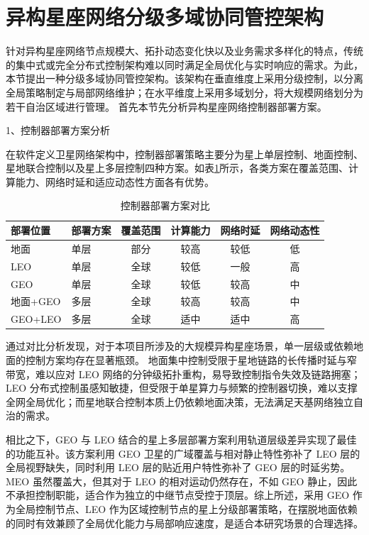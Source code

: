 \documentclass[print, master, vlined]{DissertUESTC}
\begin{document}
    \section{异构星座网络分级多域协同管控架构}
    针对异构星座网络节点规模大、拓扑动态变化快以及业务需求多样化的特点，传统的集中式或完全分布式控制架构难以同时满足全局优化与实时响应的需求。为此，本节提出一种分级多域协同管控架构。该架构在垂直维度上采用分级控制，以分离全局策略制定与局部网络维护；在水平维度上采用多域划分，将大规模网络划分为若干自治区域进行管理。 首先本节先分析异构星座网络控制器部署方案。

    1、控制器部署方案分析
    
    在软件定义卫星网络架构中，控制器部署策略主要分为星上单层控制、地面控制、星地联合控制以及星上多层控制四种方案。如表\ref{tab:controller-deployment}所示，各类方案在覆盖范围、计算能力、网络时延和适应动态性方面各有优势。
    \begin{table}[htbp] %
        \centering
        \caption{控制器部署方案对比}
        \label{tab:controller-deployment}
        \begin{tabular}{llcccc}
            \toprule
            \textbf{部署位置} & \textbf{部署方案} & \textbf{覆盖范围} & \textbf{计算能力} & \textbf{网络时延} & \textbf{网络动态性} \\
            \midrule
            地面 & 单层 & 部分 & 较高 & 较低 & 低 \\
            LEO & 单层 & 全球 & 较低 & 一般 & 高 \\
            GEO & 单层 & 全球 & 较低 & 较高 & 中 \\
            地面+GEO & 多层 & 全球 & 较高 & 较高 & 中 \\
            GEO+LEO & 多层 & 全球 & 适中 & 适中 & 高 \\
            \bottomrule
            \end{tabular}
    \end{table}

    通过对比分析发现，对于本项目所涉及的大规模异构星座场景，单一层级或依赖地面的控制方案均存在显著瓶颈。 地面集中控制受限于星地链路的长传播时延与窄带宽，难以应对 LEO 网络的分钟级拓扑重构，易导致控制指令失效及链路拥塞；LEO 分布式控制虽感知敏捷，但受限于单星算力与频繁的控制器切换，难以支撑全网全局优化；而星地联合控制本质上仍依赖地面决策，无法满足天基网络独立自治的需求。

    相比之下，GEO 与 LEO 结合的星上多层部署方案利用轨道层级差异实现了最佳的功能互补。该方案利用 GEO 卫星的广域覆盖与相对静止特性弥补了 LEO 层的全局视野缺失，同时利用 LEO 层的贴近用户特性弥补了 GEO 层的时延劣势。MEO 虽然覆盖大，但其对于 LEO 的相对运动仍然存在，不如 GEO 静止，因此不承担控制职能，适合作为独立的中继节点受控于顶层。综上所述，采用 GEO 作为全局控制节点、LEO 作为区域控制节点的星上分级部署策略，在摆脱地面依赖的同时有效兼顾了全局优化能力与局部响应速度，是适合本研究场景的合理选择。
    
\end{document}
